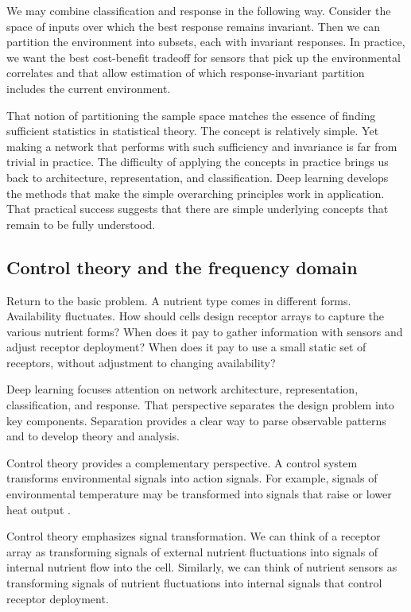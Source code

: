 \documentclass[\mydocfontsize]{article}
\begin{document}
\begin{multicols}{2}
We may combine classification and response in the following way. Consider the space of inputs over which the best response remains invariant. Then we can partition the environment into subsets, each with invariant responses. In practice, we want the best cost-benefit tradeoff for sensors that pick up the environmental correlates and that allow estimation of which response-invariant partition includes the current environment. 

That notion of partitioning the sample space matches the essence of finding sufficient statistics in statistical theory. The concept is relatively simple. Yet making a network that performs with such sufficiency and invariance is far from trivial in practice. The difficulty of applying the concepts in practice brings us back to architecture, representation, and classification. Deep learning develops the methods that make the simple overarching principles work in application. That practical success suggests that there are simple underlying concepts that remain to be fully understood.

\subsection{Control theory and the frequency domain}

Return to the basic problem. A nutrient type comes in different forms. Availability fluctuates. How should cells design receptor arrays to capture the various nutrient forms? When does it pay to gather information with sensors and adjust receptor deployment? When does it pay to use a small static set of receptors, without adjustment to changing availability?

Deep learning focuses attention on network architecture, representation, classification, and response. That perspective separates the design problem into key components. Separation provides a clear way to parse observable patterns and to develop theory and analysis.

Control theory provides a complementary perspective. A control system transforms environmental signals into action signals. For example, signals of environmental temperature may be transformed into signals that raise or lower heat output \autocite{suykens96artificial,ogata09modern}.

Control theory emphasizes signal transformation. We can think of a receptor array as transforming signals of external nutrient fluctuations into signals of internal nutrient flow into the cell. Similarly, we can think of nutrient sensors as transforming signals of nutrient fluctuations into internal signals that control receptor deployment. 


\end{multicols}
\end{document}
